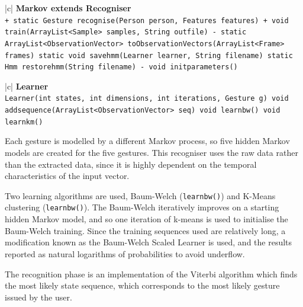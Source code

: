 \documentclass[12pt,a4,notitlepage]{report}
\renewcommand{\_}{\texttt{\symbol{95}}}
\newcommand{\<}{\texttt{\symbol{60}}}
\renewcommand{\>}{\texttt{\symbol{62}}}
\newcommand{\class}[1]{\textbf{#1}}
\newcommand{\variable}[1]{\texttt{#1}}
\begin{document}
\begin{tabular}{|c|} \hline 
\class{Markov extends Recogniser} \\ \hline
{}
{ \variable{+ static Gesture recognise(Person person, Features features) \newline
+ void train(ArrayList<Sample> samples, String out\_file) \newline
- static ArrayList<ObservationVector> toObservationVectors(ArrayList<Frame> frames) \newline
static void save\_hmm(Learner learner, String filename) \newline
static Hmm restore\_hmm(String filename) \newline
- void init\_parameters()
} } \\ \hline
\end{tabular}

\begin{tabular}{|c|} \hline 
\class{Learner} \\ \hline
{}
{ \variable{Learner(int states, int dimensions, int iterations, Gesture g) \newline
void add\_sequence(ArrayList<ObservationVector> seq) \newline
void learnbw() \newline
void learnkm()
} } \\ \hline
\end{tabular}

Each gesture is modelled by a different Markov process, so five hidden Markov models are created for the five gestures. This recogniser uses the raw data rather than the extracted data, since it is highly dependent on the temporal characteristics of the input vector.

Two learning algorithms are used, Baum-Welch (\variable{learnbw()}) and K-Means clustering (\variable{learnbw()}). The Baum-Welch iteratively improves on a starting hidden Markov model, and so one iteration of k-means is used to initialise the Baum-Welch training. Since the training sequences used are relatively long, a modification known as the Baum-Welch Scaled Learner is used, and the results reported as natural logarithms of probabilities to avoid underflow.

The recognition phase is an implementation of the Viterbi algorithm which finds the most likely state sequence, which corresponds to the most likely gesture issued by the user.

\newpage
\end{document}
